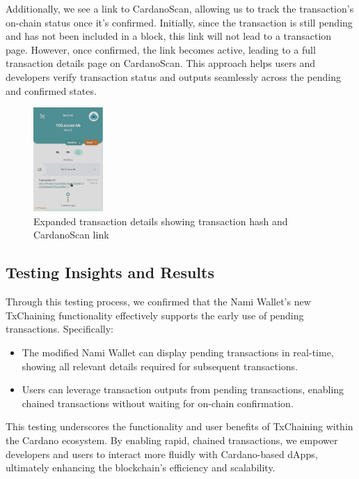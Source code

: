 \documentclass[11pt]{article}
\begin{document}
\begin{enumerate}
    Additionally, we see a link to CardanoScan, allowing us to track the transaction’s on-chain status once it’s confirmed. Initially, since the transaction is still pending and has not been included in a block, this link will not lead to a transaction page. However, once confirmed, the link becomes active, leading to a full transaction details page on CardanoScan. This approach helps users and developers verify transaction status and outputs seamlessly across the pending and confirmed states.
    \newline
    \begin{figure}[ht]
        \centering
        \includegraphics[width=100px]{./imgs/fe4}
        \caption{Expanded transaction details showing transaction hash and CardanoScan link}
    \end{figure}
\end{enumerate}

\subsection{Testing Insights and Results}

Through this testing process, we confirmed that the Nami Wallet’s new TxChaining functionality effectively supports the early use of pending transactions. Specifically:

\begin{itemize}
    \item The modified Nami Wallet can display pending transactions in real-time, showing all relevant details required for subsequent transactions.
    \item Users can leverage transaction outputs from pending transactions, enabling chained transactions without waiting for on-chain confirmation.
\end{itemize}

This testing underscores the functionality and user benefits of TxChaining within the Cardano ecosystem. By enabling rapid, chained transactions, we empower developers and users to interact more fluidly with Cardano-based dApps, ultimately enhancing the blockchain’s efficiency and scalability.
\end{document}
